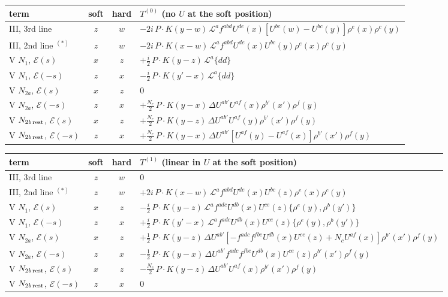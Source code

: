 \documentclass[9pt]{article}
\numberwithin{equation}{section}
\begin{document}
\begin{center}
\renewcommand{\arraystretch}{1.5}
\begin{tabular}{|l|c|c|l|}
\hline
term & soft & hard & $T^{(0)}$ (no $U$ at the soft position) \\ \hline
III, 3rd line & $z$ & $w$ & $-2i\,P\!\cdot\!K(y-w)\,\mathcal{L}^{a}f^{abd}U^{de}(x)[U^{bc}(w)-U^{bc}(y)]\rho^{e}(x)\rho^{c}(y)$ \\
III, 2nd line $^{(*)}$ & $z$ & $w$ & $-2i\,P\!\cdot\!K(x-w)\,\mathcal{L}^{a}f^{abd}U^{de}(x)U^{bc}(y)\rho^{e}(x)\rho^{c}(y)$ \\
V $N_{1}$, $\mathcal{E}(s)$ & $x$ & $z$ & $+\frac{i}{2}\,P\!\cdot\!K(y-z)\,\mathcal{L}^{a}\{dd\}$ \\
V $N_{1}$, $\mathcal{E}(-s)$ & $z$ & $x$ & $-\frac{i}{2}\,P\!\cdot\!K(y'-x)\,\mathcal{L}^{a}\{dd\}$ \\
V $N_{2a}$, $\mathcal{E}(s)$ & $x$ & $z$ & $0$ \\
V $N_{2a}$, $\mathcal{E}(-s)$ & $z$ & $x$ & $+\frac{N_{c}}{2}\,P\!\cdot\!K(y-x)\,\Delta U^{ab'}U^{af}(x)\rho^{b'}(x')\rho^{f}(y)$ \\
V $N_{2b\,\rm rest}$, $\mathcal{E}(s)$ & $x$ & $z$ & $+\frac{N_{c}}{2}\,P\!\cdot\!K(y-z)\,\Delta U^{ab'}U^{af}(y)\rho^{b'}(x')\rho^{f}(y)$ \\
V $N_{2b\,\rm rest}$, $\mathcal{E}(-s)$ & $z$ & $x$ & $+\frac{N_{c}}{2}\,P\!\cdot\!K(y-x)\,\Delta U^{ab'}[U^{af}(y)-U^{af}(x)]\rho^{b'}(x')\rho^{f}(y)$ \\ \hline
\end{tabular}

\medskip
\begin{tabular}{|l|c|c|l|}
\hline
term & soft & hard & $T^{(1)}$ (linear in $U$ at the soft position) \\ \hline
III, 3rd line & $z$ & $w$ & $0$ \\
III, 2nd line $^{(*)}$ & $z$ & $w$ & $+2i\,P\!\cdot\!K(x-w)\,\mathcal{L}^{a}f^{abd}U^{de}(x)U^{bc}(z)\rho^{e}(x)\rho^{c}(y)$ \\
V $N_{1}$, $\mathcal{E}(s)$ & $x$ & $z$ & $-\frac{i}{2}\,P\!\cdot\!K(y-z)\,\mathcal{L}^{a}f^{adc}U^{db}(x)U^{ce}(z)\{\rho^{e}(y),\rho^{b}(y')\}$ \\
V $N_{1}$, $\mathcal{E}(-s)$ & $z$ & $x$ & $+\frac{i}{2}\,P\!\cdot\!K(y'-x)\,\mathcal{L}^{a}f^{adc}U^{db}(x)U^{ce}(z)\{\rho^{e}(y),\rho^{b}(y')\}$ \\
V $N_{2a}$, $\mathcal{E}(s)$ & $x$ & $z$ & $+\frac12\,P\!\cdot\!K(y-z)\,\Delta U^{ab'}[-f^{adc}f^{fbe}U^{db}(x)U^{ce}(z)+N_{c}U^{af}(x)]\rho^{b'}(x')\rho^{f}(y)$ \\
V $N_{2a}$, $\mathcal{E}(-s)$ & $z$ & $x$ & $-\frac12\,P\!\cdot\!K(y-x)\,\Delta U^{ab'}f^{adc}f^{fbe}U^{db}(x)U^{ce}(z)\rho^{b'}(x')\rho^{f}(y)$ \\
V $N_{2b\,\rm rest}$, $\mathcal{E}(s)$ & $x$ & $z$ & $-\frac{N_{c}}{2}\,P\!\cdot\!K(y-z)\,\Delta U^{ab'}U^{af}(x)\rho^{b'}(x')\rho^{f}(y)$ \\
V $N_{2b\,\rm rest}$, $\mathcal{E}(-s)$ & $z$ & $x$ & $0$ \\ \hline
\end{tabular}
\end{center}
\end{document}
